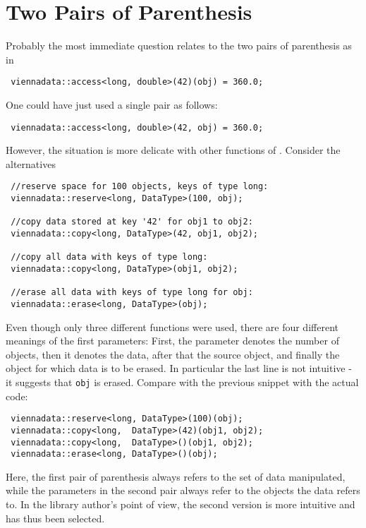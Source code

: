 \section{Two Pairs of Parenthesis}
Probably the most immediate question relates to the two pairs of parenthesis as in
\begin{lstlisting}
 viennadata::access<long, double>(42)(obj) = 360.0;
\end{lstlisting}
One could have just used a single pair as follows:
\begin{lstlisting}
 viennadata::access<long, double>(42, obj) = 360.0;
\end{lstlisting}
However, the situation is more delicate with other functions of {\ViennaData}. Consider the alternatives
\begin{lstlisting}
 //reserve space for 100 objects, keys of type long:
 viennadata::reserve<long, DataType>(100, obj);

 //copy data stored at key '42' for obj1 to obj2:
 viennadata::copy<long, DataType>(42, obj1, obj2);

 //copy all data with keys of type long:
 viennadata::copy<long, DataType>(obj1, obj2);

 //erase all data with keys of type long for obj:
 viennadata::erase<long, DataType>(obj);
\end{lstlisting}
Even though only three different functions were used, there are four different meanings of the first parameters:
First, the parameter denotes the number of objects, then it denotes the data, after that the source object, and finally the object for which data is to be erased.
In particular the last line is not intuitive - it suggests that \lstinline|obj| is erased.
Compare with the previous snippet with the actual code:
\begin{lstlisting}
 viennadata::reserve<long, DataType>(100)(obj);
 viennadata::copy<long,  DataType>(42)(obj1, obj2);
 viennadata::copy<long,  DataType>()(obj1, obj2);
 viennadata::erase<long, DataType>()(obj);
\end{lstlisting}
Here, the first pair of parenthesis always refers to the set of data manipulated, while the parameters in the second pair always refer to the objects the data refers to.
In the library author's point of view, the second version is more intuitive and has thus been selected.


